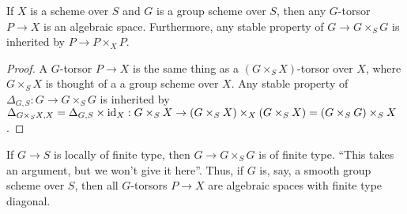 \begin{corollary} \label{lec30C:G-torsor=>AlgSp}
 If $X$ is a scheme over $S$ and $G$ is a group scheme over $S$, then any $G$-torsor $P\to X$ is an algebraic space. Furthermore, any stable property of $G\to G\times_S G$ is inherited by $P\to P\times_X P$.
\end{corollary}
\begin{proof}
 A $G$-torsor $P\to X$ is the same thing as a $(G\times_S X)$-torsor over $X$, where $G\times_S X$ is thought of a a group scheme over $X$.  Any stable property of $\Delta_{G,S}:G\to G\times_S G$ is inherited by $\Delta_{G\times_S X,X}=\Delta_{G,S}\times \operatorname{id}_X:G\times_S X\to (G\times_S X)\times_X (G\times_S X)=(G\times_S G)\times_S X$.
\end{proof}
\begin{remark}
  If $G\to S$ is locally of finite type, then $G\to G\times_S G$ is of finite type. ``This takes an argument, but we won't give it here''. Thus, if $G$ is, say, a smooth group scheme over $S$, then all $G$-torsors $P\to X$ are algebraic spaces with finite type diagonal.
\end{remark}

